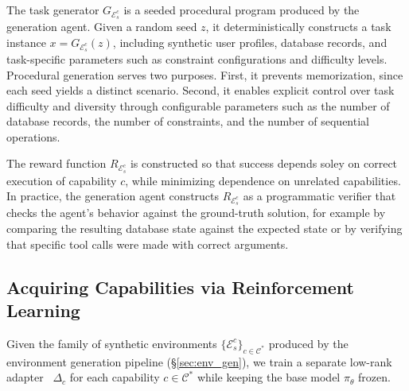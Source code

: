 The task generator $G_{\mathcal{E}_s^c}$ is a seeded procedural program produced by the generation agent. Given a random seed $z$, it deterministically constructs a task instance $x = G_{\mathcal{E}_s^c}(z)$, including synthetic user profiles, database records, and task-specific parameters such as constraint configurations and difficulty levels. Procedural generation serves two purposes. First, it prevents memorization, since each seed yields a distinct scenario. Second, it enables explicit control over task difficulty and diversity through configurable parameters such as the number of database records, the number of constraints, and the number of sequential operations.

The reward function $R_{\mathcal{E}_s^c}$ is constructed so that success depends soley on correct execution of capability $c$, while minimizing dependence on unrelated capabilities. In practice, the generation agent constructs $R_{\mathcal{E}_s^c}$ as a programmatic verifier that checks the agent's behavior against the ground-truth solution, for example by comparing the resulting database state against the expected state or by verifying that specific tool calls were made with correct arguments.




\subsection{Acquiring Capabilities via Reinforcement Learning}
\label{sec:training}

Given the family of synthetic environments $\{\mathcal{E}_s^c\}_{c \in \mathcal{C}^{*}}$ produced by the environment generation pipeline (\S\ref{sec:env_gen}), we train a separate low-rank adapter~\citep{hu2022lora} $\Delta_c$ for each capability $c \in \mathcal{C}^{*}$ while keeping the base model $\pi_\theta$ frozen.

